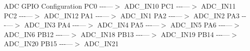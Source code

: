 A\-D\-C G\-P\-I\-O Configuration P\-C0 -\/-\/-\/---$>$ A\-D\-C\-\_\-\-I\-N10 P\-C1 -\/-\/-\/---$>$ A\-D\-C\-\_\-\-I\-N11 P\-C2 -\/-\/-\/---$>$ A\-D\-C\-\_\-\-I\-N12 P\-A1 -\/-\/-\/---$>$ A\-D\-C\-\_\-\-I\-N1 P\-A2 -\/-\/-\/---$>$ A\-D\-C\-\_\-\-I\-N2 P\-A3 -\/-\/-\/---$>$ A\-D\-C\-\_\-\-I\-N3 P\-A4 -\/-\/-\/---$>$ A\-D\-C\-\_\-\-I\-N4 P\-A5 -\/-\/-\/---$>$ A\-D\-C\-\_\-\-I\-N5 P\-A6 -\/-\/-\/---$>$ A\-D\-C\-\_\-\-I\-N6 P\-B12 -\/-\/-\/---$>$ A\-D\-C\-\_\-\-I\-N18 P\-B13 -\/-\/-\/---$>$ A\-D\-C\-\_\-\-I\-N19 P\-B14 -\/-\/-\/---$>$ A\-D\-C\-\_\-\-I\-N20 P\-B15 -\/-\/-\/---$>$ A\-D\-C\-\_\-\-I\-N21